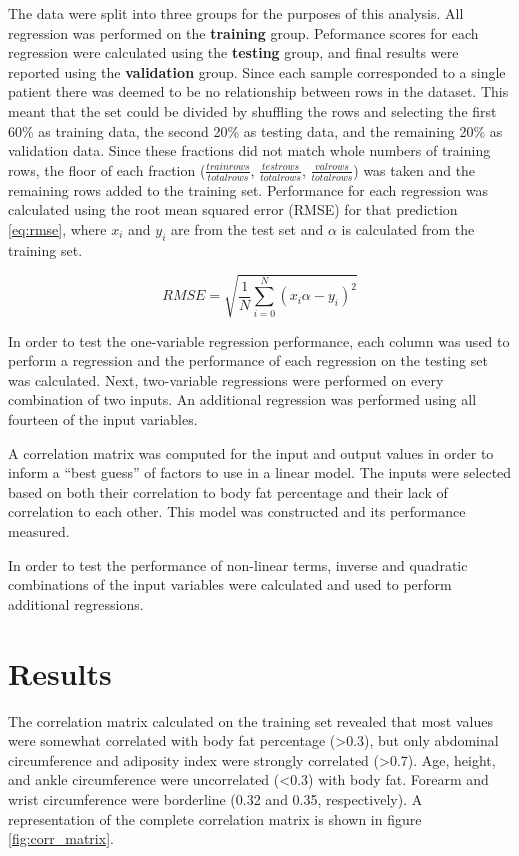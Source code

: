 \documentclass{IEEEtran}
\begin{document}
The data were split into three groups for the purposes of this analysis. All regression was performed on the \textbf{training} group. Peformance scores for each regression were calculated using the \textbf{testing} group, and final results were reported using the \textbf{validation} group. Since each sample corresponded to a single patient there was deemed to be no relationship between rows in the dataset. This meant that the set could be divided by shuffling the rows and selecting the first 60\% as training data, the second 20\% as testing data, and the remaining 20\% as validation data. Since these fractions did not match whole numbers of training rows, the floor of each fraction ($\frac{train rows}{total rows}$, $\frac{test rows}{total rows}$, $\frac{val rows}{total rows}$) was taken and the remaining rows added to the training set. Performance for each regression was calculated using the root mean squared error (RMSE) for that prediction \eqref{eq:rmse}, where $x_i$ and $y_i$ are from the test set and $\alpha$ is calculated from the training set.

\begin{equation}
	RMSE = \sqrt{\frac{1}{N} \sum_{i=0}^N{(x_i \alpha - y_i)^2} }
	\label{eq:rmse}
\end{equation}

In order to test the one-variable regression performance, each column was used to perform a regression and the performance of each regression on the testing set was calculated. Next, two-variable regressions were performed on every combination of two inputs. An additional regression was performed using all fourteen of the input variables.

A correlation matrix was computed for the input and output values in order to inform a ``best guess'' of factors to use in a linear model. The inputs were selected based on both their correlation to body fat percentage and their lack of correlation to each other. This model was constructed and its performance measured.

In order to test the performance of non-linear terms, inverse and quadratic combinations of the input variables were calculated and used to perform additional regressions. 

\section{Results}

The correlation matrix calculated on the training set revealed that most values were somewhat correlated with body fat percentage (>0.3), but only abdominal circumference and adiposity index were strongly correlated (>0.7). Age, height, and ankle circumference were uncorrelated (<0.3) with body fat. Forearm and wrist circumference were borderline (0.32 and 0.35, respectively). A representation of the complete correlation matrix is shown in figure \ref{fig:corr_matrix}.
\end{document}
